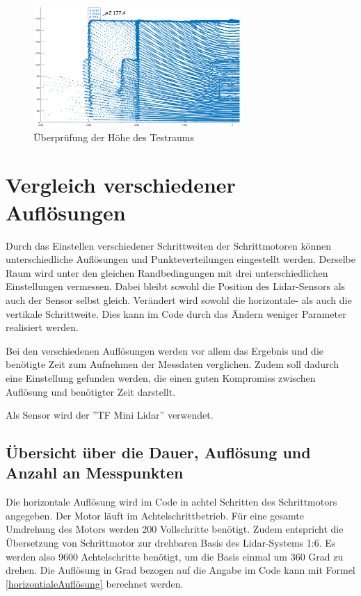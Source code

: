 \begin{figure} [H]
	\centering
	\includegraphics[width=0.7\textwidth]{images/Validierung/Genauigkeit/Hoehe1}
	\caption{Überprüfung der Höhe des Testraums}
	\label{Hoehe}
\end{figure}







\section{Vergleich verschiedener Auflösungen}

Durch das Einstellen verschiedener Schrittweiten der Schrittmotoren können unterschiedliche Auflösungen und Punkteverteilungen eingestellt werden. Derselbe Raum wird unter den gleichen Randbedingungen mit drei unterschiedlichen Einstellungen vermessen. Dabei bleibt sowohl die Position des Lidar-Sensors als auch der Sensor selbst gleich. Verändert wird sowohl die horizontale- als auch die vertikale Schrittweite. Dies kann im Code durch das Ändern weniger Parameter realisiert werden.

Bei den verschiedenen Auflösungen werden vor allem das Ergebnis und die benötigte Zeit zum Aufnehmen der Messdaten verglichen. Zudem soll dadurch eine Einstellung gefunden werden, die einen guten Kompromiss zwischen Auflösung und benötigter Zeit darstellt. 

Als Sensor wird der ''TF Mini Lidar'' verwendet.


\subsection{Übersicht über die Dauer, Auflösung und Anzahl an Messpunkten} \label{sec:auflösung}

Die horizontale Auflösung wird im Code in achtel Schritten des Schrittmotors angegeben. Der Motor läuft im Achtelschrittbetrieb. Für eine gesamte Umdrehung des Motors werden 200 Vollschritte benötigt. Zudem entspricht die Übersetzung von Schrittmotor zur drehbaren Basis des Lidar-Systems 1:6. Es werden also 9600 Achtelschritte benötigt, um die Basis einmal um 360 Grad zu drehen. Die Auflösung in Grad bezogen auf die Angabe im Code kann mit Formel \ref{horizontialeAuflösung} berechnet werden. 

